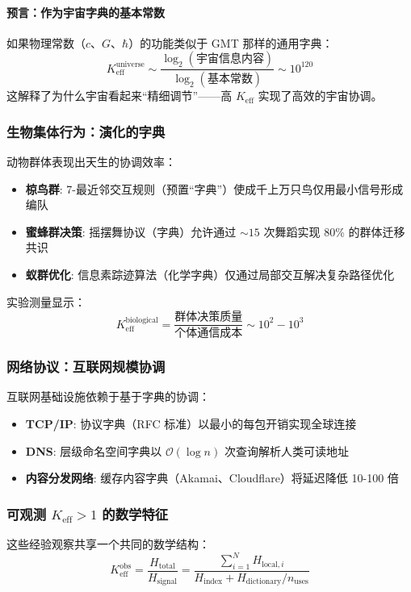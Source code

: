 \documentclass[11pt,a4paper]{article}
\begin{document}
	\paragraph{预言：作为宇宙字典的基本常数}
	如果物理常数（$c$、$G$、$\hbar$）的功能类似于 GMT 那样的通用字典：
	\begin{equation}
		K_{\mathrm{eff}}^{\mathrm{universe}} \sim \frac{\log_2(\text{宇宙信息内容})}{\log_2(\text{基本常数})} \sim 10^{120}
	\end{equation}
	这解释了为什么宇宙看起来“精细调节”——高 $K_{\mathrm{eff}}$ 实现了高效的宇宙协调。
	
	\subsubsection{生物集体行为：演化的字典}
	动物群体表现出天生的协调效率：
	\begin{itemize}
		\item \textbf{椋鸟群}: 7-最近邻交互规则（预置“字典”）使成千上万只鸟仅用最小信号形成编队
		\item \textbf{蜜蜂群决策}: 摇摆舞协议（字典）允许通过 $\sim 15$ 次舞蹈实现 80\% 的群体迁移共识
		\item \textbf{蚁群优化}: 信息素踪迹算法（化学字典）仅通过局部交互解决复杂路径优化
	\end{itemize}
	
	实验测量显示：
	\begin{equation}
		K_{\mathrm{eff}}^{\text{biological}} = \frac{\text{群体决策质量}}{\text{个体通信成本}} \sim 10^2 - 10^3
	\end{equation}
	
	\subsubsection{网络协议：互联网规模协调}
	互联网基础设施依赖于基于字典的协调：
	\begin{itemize}
		\item \textbf{TCP/IP}: 协议字典（RFC 标准）以最小的每包开销实现全球连接
		\item \textbf{DNS}: 层级命名空间字典以 $\mathcal{O}(\log n)$ 次查询解析人类可读地址
		\item \textbf{内容分发网络}: 缓存内容字典（Akamai、Cloudflare）将延迟降低 10-100 倍
	\end{itemize}
	
	\subsubsection{可观测 $K_{\mathrm{eff}} > 1$ 的数学特征}
	这些经验观察共享一个共同的数学结构：
	\begin{equation}
		K_{\mathrm{eff}}^{\text{obs}} = \frac{H_{\text{total}}}{H_{\text{signal}}} = \frac{\sum_{i=1}^N H_{\text{local}, i}}{H_{\text{index}} + H_{\text{dictionary}}/n_{\text{uses}}}
	\end{equation}
	
\end{document}
